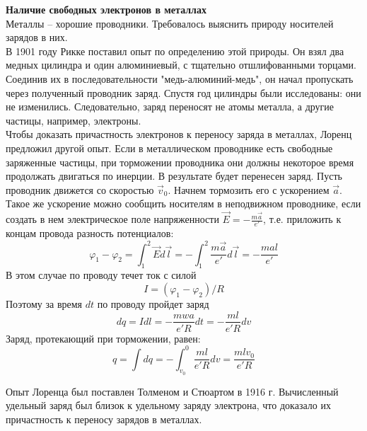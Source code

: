 \documentclass{article}
\begin{document}
	
	\textbf{Наличие свободных электронов в металлах}\\

	Металлы -- хорошие проводники. Требовалось выяснить природу носителей зарядов в них.\\

	В 1901 году Рикке поставил опыт по определению этой природы. Он взял два медных цилиндра и один алюминиевый, с тщательно отшлифованными торцами. Соединив их в последовательности "медь-алюминий-медь", он начал пропускать через полученный проводник заряд. Спустя год цилиндры были исследованы: они не изменились. Следовательно, заряд переносят не атомы металла, а другие частицы, например, электроны. \\

	Чтобы доказать причастность электронов к переносу заряда в металлах, Лоренц предложил другой опыт. Если в металлическом проводнике есть свободные заряженные частицы, при торможении проводника они должны некоторое время продолжать двигаться по инерции. В результате будет перенесен заряд. Пусть проводник движется со скоростью $\vec v_0$. Начнем тормозить его с ускорением $\vec a$. Такое же ускорение можно сообщить носителям в неподвижном проводнике, если создать в нем электрическое поле напряженности $\vec E = -\frac{m\vec a}{e'}$, т.е. приложить к концам провода разность потенциалов:
	\begin{equation}
		\varphi_1 - \varphi_2 = \int_1^2 \vec E d\vec l = -\int_1^2\frac{m\vec a}{e'} d\vec l = -\frac{mal}{e'}
	\end{equation}
	В этом случае по проводу течет ток с силой
	\begin{equation}
		I = (\varphi_1-\varphi_2)/R
	\end{equation}
	Поэтому за время $dt$ по проводу пройдет заряд
	\begin{equation}
		dq = Idl = -\frac{mwa}{e'R}dt = -\frac{ml}{e'R}dv
	\end{equation}
	Заряд, протекающий при торможении, равен:
	\begin{equation}
		q = \int dq = -\int_{v_0}^0 \frac{ml}{e'R}dv = \frac{mlv_0}{e'R}
	\end{equation}

	Опыт Лоренца был поставлен Толменом и Стюартом в 1916 г. Вычисленный удельный заряд был близок к удельному заряду электрона, что доказало их причастность к переносу зарядов в металлах.
\end{document}
